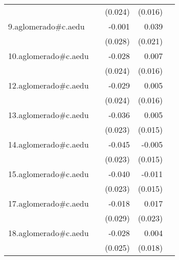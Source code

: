 {\begin{longtable}{l*{4}{D{.}{.}{-1}}}
            &                     &     (0.024)         &     (0.016)         &                     \\
\addlinespace
9.aglomerado#c.aedu&                     &      -0.001         &       0.039         &                     \\
            &                     &     (0.028)         &     (0.021)         &                     \\
\addlinespace
10.aglomerado#c.aedu&                     &      -0.028         &       0.007         &                     \\
            &                     &     (0.024)         &     (0.016)         &                     \\
\addlinespace
12.aglomerado#c.aedu&                     &      -0.029         &       0.005         &                     \\
            &                     &     (0.024)         &     (0.016)         &                     \\
\addlinespace
13.aglomerado#c.aedu&                     &      -0.036         &       0.005         &                     \\
            &                     &     (0.023)         &     (0.015)         &                     \\
\addlinespace
14.aglomerado#c.aedu&                     &      -0.045         &      -0.005         &                     \\
            &                     &     (0.023)         &     (0.015)         &                     \\
\addlinespace
15.aglomerado#c.aedu&                     &      -0.040         &      -0.011         &                     \\
            &                     &     (0.023)         &     (0.015)         &                     \\
\addlinespace
17.aglomerado#c.aedu&                     &      -0.018         &       0.017         &                     \\
            &                     &     (0.029)         &     (0.023)         &                     \\
\addlinespace
18.aglomerado#c.aedu&                     &      -0.028         &       0.004         &                     \\
            &                     &     (0.025)         &     (0.018)         &                     \\

\end{longtable}}
